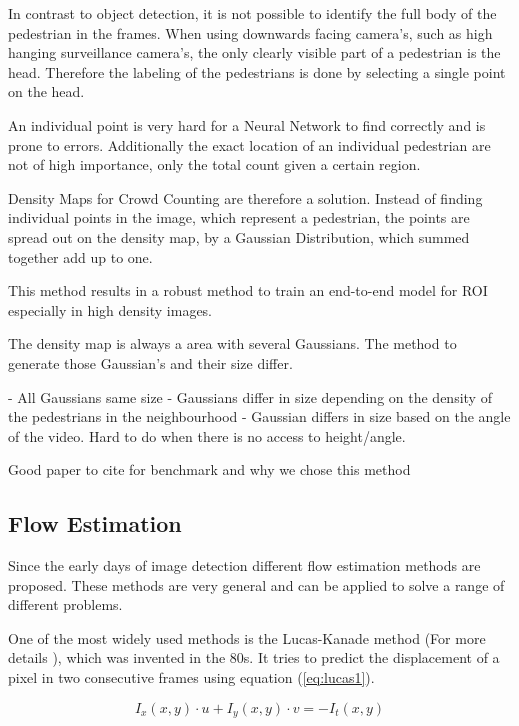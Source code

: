 \documentclass{article}
\begin{document}
In contrast to object detection, it is not possible to identify the full body of the pedestrian in the frames. When using downwards facing camera's, such as high hanging surveillance camera's, the only clearly visible part of a pedestrian is the head. Therefore the labeling of the pedestrians is done by selecting a single point on the head.

An individual point is very hard for a Neural Network to find correctly and is prone to errors. Additionally the exact location of an individual pedestrian are not of high importance, only the total count given a certain region.

Density Maps for Crowd Counting are therefore a solution. Instead of finding individual points in the image, which represent a pedestrian, the points are spread out on the density map, by a Gaussian Distribution, which summed together add up to one.

This method results in a robust method to train an end-to-end model for ROI especially in high density images.


The density map is always a area with several Gaussians. The method to generate those Gaussian's and their size differ.

- All Gaussians same size
- Gaussians differ in size depending on the density of the pedestrians in the neighbourhood
- Gaussian differs in size based on the angle of the video. Hard to do when there is no access to height/angle.

Good paper to cite for benchmark and why we chose this method
\cite{wang2020nwpu}
\cite{li2018csrnet}



\subsection{Flow Estimation}
Since the early days of image detection different flow estimation methods are proposed. These methods are very general and can be applied to solve a range of different problems.

One of the most widely used methods is the Lucas-Kanade method (For more details \cite{lucas_kan_nutshell}), which was invented in the 80s. It tries to predict the displacement of a pixel in two consecutive frames using equation (\ref{eq:lucas1}).

\begin{equation} \label{eq:lucas1}
I_x(x, y) \cdot u + I_y(x,y) \cdot v = -I_t(x,y)
\end{equation}
\end{document}
